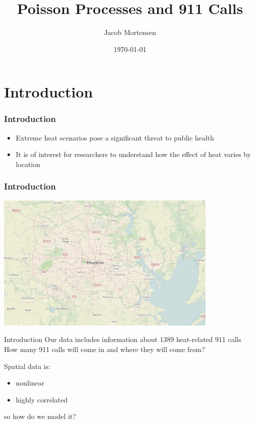 \documentclass[10pt, compress]{beamer}
\title{Poisson Processes and 911 Calls}
\subtitle{}
\date{\today}
\author{Jacob Mortensen}
\institute{Brigham Young University}
\begin{document}
  \maketitle
  
  \section{Introduction}
  \begin{frame}
    \frametitle{Introduction}
    \begin{itemize}
      \item Extreme heat scenarios pose a significant threat to public health
      \item It is of interest for researchers to understand how the effect of heat varies by location
    \end{itemize}
  \end{frame}
  \begin{frame}
    \frametitle{Introduction}
    \centering
    \includegraphics[width=0.8\textwidth]{houston_map.jpg}
  \end{frame}
  \begin{frame}{Introduction}
    Our data includes information about 1389 heat-related 911 calls \newline
    \newline
    How many 911 calls will come in and where they will come from? \newline

    \centering
    \begin{minipage}{0.8\textwidth}
      Spatial data is:
      \begin{itemize}
        \item nonlinear
        \item highly correlated
      \end{itemize}
    so how do we model it?
    \end{minipage}
  \end{frame}
\end{document}
